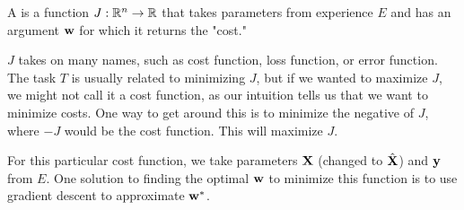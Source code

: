 \begin{definition}
A  is a function $J : \R^n \to \R$ that takes parameters from experience $E$ and has an argument $\vw$ for which it returns the "cost."
\end{definition}

\begin{note}
$J$ takes on many names, such as cost function, loss function, or error function. The task $T$ is usually related to minimizing $J$, but if we wanted to maximize $J$, we might not call it a cost function, as our intuition tells us that we want to minimize costs. One way to get around this is to minimize the negative of $J$, where $-J$ would be the cost function. This will maximize $J$.
\end{note}

For this particular cost function, we take parameters $\MX$ (changed to $\hat{\MX}$) and $\vy$ from $E$. One solution to finding the optimal $\vw$ to minimize this function is to use gradient descent to approximate $\vw^\ast$.

